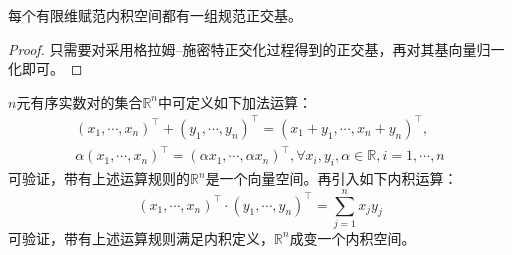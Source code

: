 \documentclass[main.tex]{subfiles}
\begin{document}
\begin{corollary}
    每个有限维赋范内积空间都有一组规范正交基。
\end{corollary}
\begin{proof}
只需要对采用格拉姆--施密特正交化过程得到的正交基，再对其基向量归一化即可。
\end{proof}

\begin{example}
$n$元有序实数对的集合$\mathbb{R}^n$中可定义如下加法运算：
\begin{align*}
\left(x_1,\cdots,x_n\right)^\intercal+\left(y_1,\cdots,y_n\right)^\intercal=\left(x_1+y_1,\cdots,x_n+y_n\right)^\intercal,\\
\alpha\left(x_1,\cdots,x_n\right)^\intercal=\left(\alpha x_1,\cdots,\alpha x_n\right)^\intercal,\forall x_i,y_i,\alpha\in\mathbb{R},i=1,\cdots,n
\end{align*}
可验证，带有上述运算规则的$\mathbb{R}^n$是一个向量空间。再引入如下内积运算：
\[
\left(x_1,\cdots,x_n\right)^\intercal\cdot\left(y_1,\cdots,y_n\right)^\intercal=\sum_{j=1}^nx_jy_j\]
可验证，带有上述运算规则满足内积定义，$\mathbb{R}^n$成变一个内积空间。
\end{example}
\end{document}
